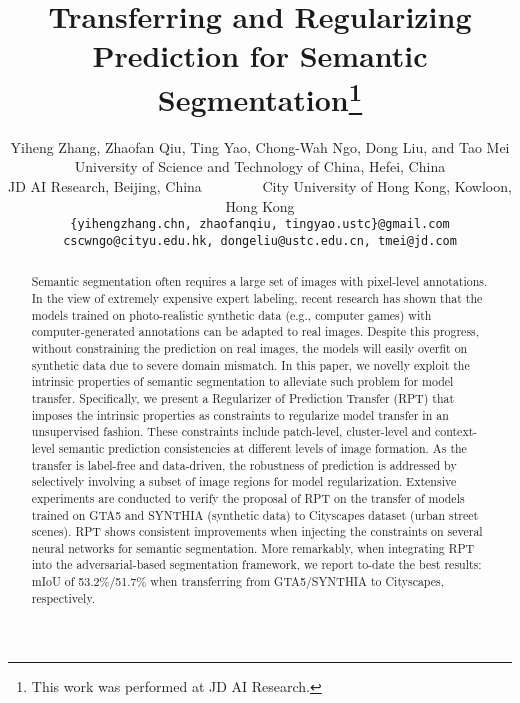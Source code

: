 \documentclass[10pt,twocolumn,letterpaper]{article}
\begin{document}
\title{Transferring and Regularizing Prediction for Semantic Segmentation\thanks{{\small This work was performed at JD AI Research.}}}

\author{Yiheng Zhang, Zhaofan Qiu, Ting Yao, Chong-Wah Ngo, Dong Liu, and Tao Mei \\
{\normalsize  University of Science and Technology of China, Hefei, China}\\
{\normalsize  JD AI Research, Beijing, China~~~~~~~~ City University of Hong Kong, Kowloon, Hong Kong}\\
{\tt\small \{yihengzhang.chn, zhaofanqiu, tingyao.ustc\}@gmail.com}\\
{\tt\small cscwngo@cityu.edu.hk, dongeliu@ustc.edu.cn, tmei@jd.com}
}

\maketitle
\thispagestyle{empty}

\begin{abstract}
   \vspace{-0.1in}
   Semantic segmentation often requires a large set of images with pixel-level annotations. In the view of extremely expensive expert labeling, recent research has shown that the models trained on photo-realistic synthetic data (e.g., computer games) with computer-generated annotations can be adapted to real images. Despite this progress, without constraining the prediction on real images, the models will easily overfit on synthetic data due to severe domain mismatch.
   In this paper, we novelly exploit the intrinsic properties of semantic segmentation to alleviate such problem for model transfer.
   Specifically, we present a Regularizer of Prediction Transfer (RPT) that imposes the intrinsic properties as constraints to regularize model transfer in an unsupervised fashion. These constraints include patch-level, cluster-level and context-level semantic prediction consistencies at different levels of image formation. As the transfer is label-free and data-driven, the robustness of prediction is addressed by selectively involving a subset of image regions for model regularization. Extensive experiments are conducted to verify the proposal of RPT on the transfer of models trained on GTA5 and SYNTHIA (synthetic data) to Cityscapes dataset (urban street scenes). RPT shows consistent improvements when injecting the constraints on several neural networks for semantic segmentation. More remarkably, when integrating RPT into the adversarial-based segmentation framework, we report to-date the best results: mIoU of 53.2\%/51.7\% when transferring from GTA5/SYNTHIA to Cityscapes, respectively.
\end{abstract}
\vspace{-0.15in}
\end{document}
